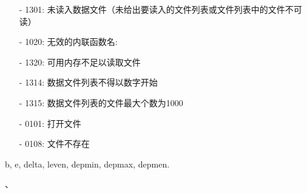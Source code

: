 \begin{itemize}
\item[-]1301: 未读入数据文件（未给出要读入的文件列表或文件列表中的文件不可读）
\item[-]1020: 无效的内联函数名:
\item[-]1320: 可用内存不足以读取文件
\item[-]1314: 数据文件列表不得以数字开始
\item[-]1315: 数据文件列表的文件最大个数为1000
\end{itemize}

\begin{itemize}
\item[-]0101: 打开文件
\item[-]0108: 文件不存在
\end{itemize}

b, e, delta, leven, depmin, depmax, depmen.

、
